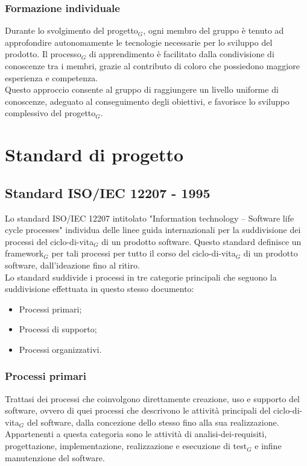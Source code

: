 \documentclass[10pt]{article}
\begin{document}
\begin{justify}
    \subsubsection{Formazione individuale}
    Durante lo svolgimento del progetto$_G$, ogni membro del gruppo è tenuto ad approfondire autonomamente le tecnologie necessarie per lo sviluppo del prodotto. Il processo$_G$ di apprendimento è facilitato dalla condivisione di conoscenze tra i membri, grazie al contributo di coloro che possiedono maggiore esperienza e competenza.\\
    Questo approccio consente al gruppo di raggiungere un livello uniforme di conoscenze, adeguato al conseguimento degli obiettivi, e favorisce lo sviluppo complessivo del progetto$_G$.

\newpage
\section{Standard di progetto}

    \subsection{Standard ISO/IEC 12207 - 1995}
    \label{standard_12207}
    Lo standard ISO/IEC 12207 intitolato "Information technology – Software life cycle processes" individua delle linee guida internazionali per la suddivisione dei processi del ciclo-di-vita$_G$  di un prodotto software. Questo standard definisce un framework$_G$ per tali processi per tutto il corso del ciclo-di-vita$_G$ di un prodotto software, dall'ideazione fino al ritiro.\\
    Lo standard suddivide i processi in tre categorie principali che seguono la suddivisione effettuata in questo stesso documento:
    \begin{itemize}
        \item Processi primari;
        \item Processi di supporto;
        \item Processi organizzativi.
    \end{itemize}

        \subsubsection{Processi primari}
        Trattasi dei processi che coinvolgono direttamente creazione, uso e supporto del software, ovvero di quei processi che descrivono
        le attività principali del ciclo-di-vita$_G$ del software, dalla concezione dello stesso fino alla sua realizzazione. Appartenenti a questa categoria sono le attività di analisi-dei-requisiti, progettazione, implementazione, realizzazione e esecuzione di test$_G$ e infine manutenzione del software.


\end{justify}
\end{document}
